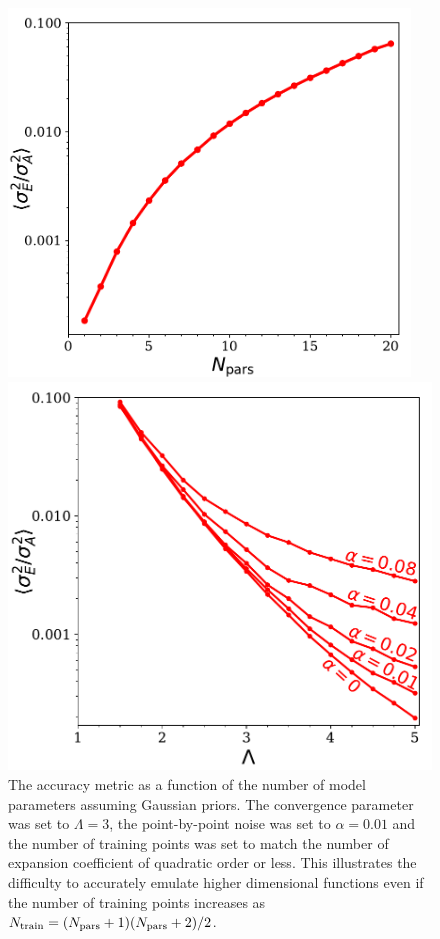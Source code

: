 \documentclass[UserManual.tex]{subfiles}
\begin{document}
\begin{figure}
\begin{minipage}{0.475\textwidth}
\includegraphics[width=0.95\textwidth]{figs/sigma2vsNpars}
\caption{\label{fig:Sigma2vsNpars}
The accuracy metric as a function of the number of model parameters assuming Gaussian priors. The convergence parameter was set to $\Lambda=3$, the point-by-point noise was set to $\alpha=0.01$ and the number of training points was set to match the number of expansion coefficient of quadratic order or less. This illustrates the difficulty to accurately emulate higher dimensional functions even if the number of training points increases as $N_{\rm train}=(N_{\rm pars}+1)(N_{\rm pars}+2)/2$.}
\end{minipage}
\hspace*{0.025\textwidth}
\begin{minipage}{0.475\textwidth}
\includegraphics[width=\textwidth]{figs/Sigma2vsLambda}

\end{minipage}
\end{figure}
\end{document}
